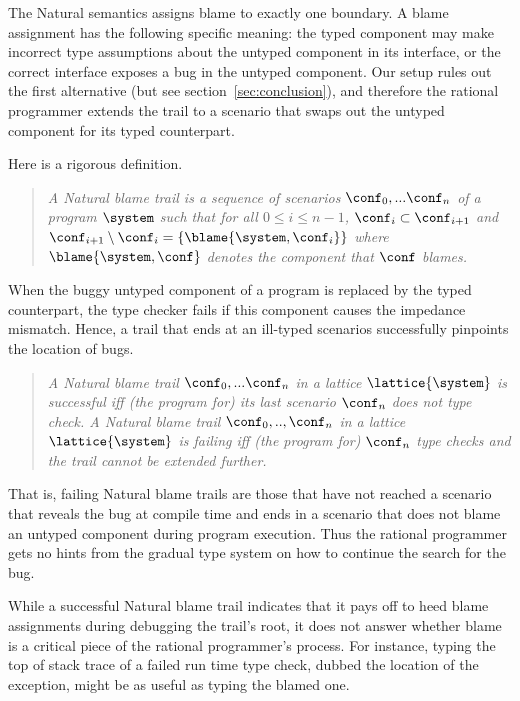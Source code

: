 
The Natural semantics assigns blame to exactly one boundary.  A blame assignment
has the following specific meaning: the typed component may make incorrect type
assumptions about the untyped component in its interface, or the correct
interface exposes a bug in the untyped component. Our setup rules out the first
alternative (but see section~\ref{sec:conclusion}), and therefore the rational
programmer extends the trail to a scenario that swaps out the untyped component
for its typed counterpart.

Here is a rigorous definition.
\begin{quote}
\it A \emph{Natural blame trail} is a sequence of scenarios $\conf_0,...\conf_n$ of
a program $\system$ such that for all $0 \leq i \leq n - 1$, $\conf_i \subset
\conf_{i+1}$ and $\conf_{i+1} \setminus \conf_i =\{\blame{\system, \conf_i}\}$ where
$\blame{\system, \conf}$ denotes the component that $\conf$ blames.
\end{quote}

When the buggy untyped component of a program is replaced by the typed counterpart,
the type checker fails if this component causes the impedance mismatch. Hence, a
trail that ends at an ill-typed scenarios successfully pinpoints the location of
bugs. 
\begin{quote}
\it A Natural blame trail $\conf_0,...\conf_n$ in a lattice $\lattice{\system}$ is
\emph{successful} iff (the program for) its last scenario $\conf_n$ does not type check.  A Natural
blame trail $\conf_0,..,\conf_n$ in a lattice $\lattice{\system}$ is \emph{failing}
iff (the program for) $\conf_n$ type checks and the trail cannot be extended further.
\end{quote}
That is, failing Natural blame trails are those that have not reached a scenario
that reveals the bug at compile time and ends in a scenario that does not blame
an untyped component during program execution. Thus the rational programmer gets
no hints from the gradual type system on how to continue the search for the bug.

While a successful Natural blame trail indicates that it 
pays off to heed blame assignments during debugging the trail's root, it does not answer whether
blame is a critical piece of the rational programmer's process.  For instance,
typing the top of stack trace of a failed run time type check, dubbed the
location of the exception, might be as useful as typing the blamed one.

